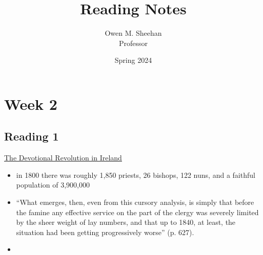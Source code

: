 \documentclass[12pt]{article}
\title{\class{} Reading Notes}
\author{Owen M. Sheehan\\Professor \prof{}}
\date{Spring 2024}
\begin{document}
\maketitle
\tableofcontents
\newpage

    \section{Week 2}
        \subsection{Reading 1}
        \bigskip
        \href{run:./PDFs/Reading1.pdf}{The Devotional Revolution in Ireland}
            \begin{itemize}
                \item in 1800 there was roughly 1,850 priests, 26 bishops, 122 nuns, and a faithful population of 3,900,000
                \item ``What emerges, then, even from this cursory analysis, is simply
                that before the famine any effective service on the part of the clergy was
                severely limited by the sheer weight of lay numbers, and that up to 1840,
                at least, the situation had been getting progressively worse'' (p. 627).
                \item 
            \end{itemize}
\end{document}
